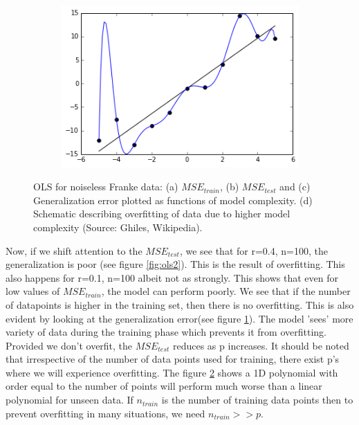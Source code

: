 \begin{figure}[htb]
\begin{subfigure}{.5\textwidth}
  \caption{}
  \label{fig:ols3}
\end{subfigure}
\begin{subfigure}{.45\textwidth}
  \centering
  \includegraphics[width=.9\linewidth]{Images/Overfitted_Data.png}
  \caption{}
  \label{fig:overfit}
\end{subfigure}
\caption{OLS for noiseless Franke data: (a) $MSE_{train}$, (b) $MSE_{test}$ and (c) Generalization error plotted as functions of model complexity. (d) Schematic describing overfitting of data due to higher model complexity (Source: Ghiles, Wikipedia). }
\label{fig:OLS1}
\end{figure}

Now, if we shift attention to the $MSE_{test}$, we see that for r=0.4, n=100, the generalization is poor (see figure \ref{fig:ols2}). This is the result of overfitting. This also happens for r=0.1, n=100 albeit not as strongly. This shows that even for low values of $MSE_{train}$, the model can perform poorly. We see that if the number of datapoints is higher in the training set, then there is no overfitting. This is also evident by looking at the generalization error(see figure \ref{fig:ols3}). The model 'sees' more variety of data during the training phase which prevents it from overfitting. Provided we don't overfit, the $MSE_{test}$ reduces as p  increases. It should be noted that irrespective of the number of data points used for training, there exist p's where we will experience overfitting. The figure \ref{fig:overfit} shows a 1D polynomial with order equal to the number of points will perform much worse than a linear polynomial for unseen data. If $n_{train}$ is the number of training data points then to prevent overfitting in many situations, we need $n_{train} >> p$. 

